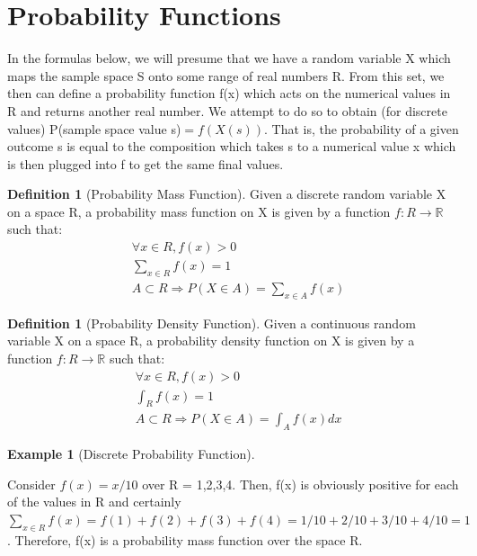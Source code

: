 \documentclass[10pt,]{book}
\theoremstyle{plain}
\theoremstyle{definition}
\newtheorem{definition}[theorem]{Definition}
\theoremstyle{definition}
\newtheorem{example}[theorem]{Example}
\numberwithin{equation}{section}
\newcommand{\gt}{ > }
\begin{document}
\section[Probability Functions]{Probability Functions}\label{ProbabilityFunctions}
In the formulas below, we will presume that we have a random variable X which maps the sample space S onto some range of real numbers R.  From this set, we then can define a probability function f(x) which acts on the numerical values in R and returns another real number.  We attempt to do so to obtain (for discrete values) P(sample space value s)\( = f(X(s))\).  That is, the probability of a given outcome s is equal to the composition which takes s to a numerical value x which is then plugged into f to get the same final values.%
\begin{definition}[Probability Mass Function]\label{definition-27}
Given a discrete random variable X on a space R, a probability mass function on X is given by a function \(f:R \rightarrow \mathbb{R}\) such that:
		\begin{align*}
& \forall x \in R , f(x) \gt 0\\
& \sum_{x \in R} f(x) = 1\\
& A \subset R \Rightarrow P(X \in A) = \sum_{x \in A}f(x)
\end{align*}\end{definition}
\begin{definition}[Probability Density Function]\label{definition-28}
Given a continuous random variable X on a space R, a probability density function on X is given by a function \(f:R \rightarrow \mathbb{R}\) such that:
			\begin{align*}
& \forall x \in R , f(x) \gt 0\\
& \int_{R} f(x) = 1\\
& A \subset R \Rightarrow P(X \in A) = \int_{A} f(x) dx
\end{align*}\end{definition}
\begin{example}[Discrete Probability Function]\label{example-17}

	Consider \(f(x) = x/10\) over R = {1,2,3,4}.  Then, f(x) is obviously positive for each of the values in R and certainly \(\sum_{x \in R} f(x) = f(1) + f(2) + f(3) + f(4) = 1/10 + 2/10 + 3/10 + 4/10 = 1\). Therefore, f(x) is a probability mass function over the space R.
\end{example}
\end{document}
